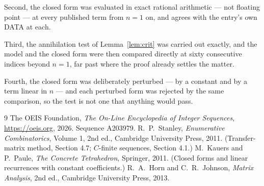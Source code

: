 \documentclass[11pt,a4paper]{article}
\theoremstyle{plain}
\theoremstyle{definition}
\begin{document}
Second, the closed form was evaluated in exact rational arithmetic --- not floating point ---
at every published term from $n=1$ on, and agrees with the entry's own DATA at each.

Third, the annihilation test of Lemma~\ref{lem:crit} was carried out exactly, and the model
and the closed form were then compared directly at sixty consecutive indices beyond
$n=1$, far past where the proof already settles the matter.

Fourth, the closed form was deliberately perturbed --- by a constant and by a term linear in
$n$ --- and each perturbed form was rejected by the same comparison, so the test is not one
that anything would pass.

\begin{thebibliography}{9}
 The OEIS Foundation, \emph{The On-Line Encyclopedia of Integer
Sequences}, \url{https://oeis.org}, 2026. Sequence A203979.
 R.~P.~Stanley, \emph{Enumerative Combinatorics}, Volume 1, 2nd ed.,
Cambridge University Press, 2011. (Transfer-matrix method, Section 4.7; $C$-finite sequences,
Section 4.1.)
 M.~Kauers and P.~Paule, \emph{The Concrete Tetrahedron}, Springer, 2011.
(Closed forms and linear recurrences with constant coefficients.)
 R.~A.~Horn and C.~R.~Johnson, \emph{Matrix Analysis}, 2nd ed., Cambridge
University Press, 2013.
\end{thebibliography}
\end{document}
